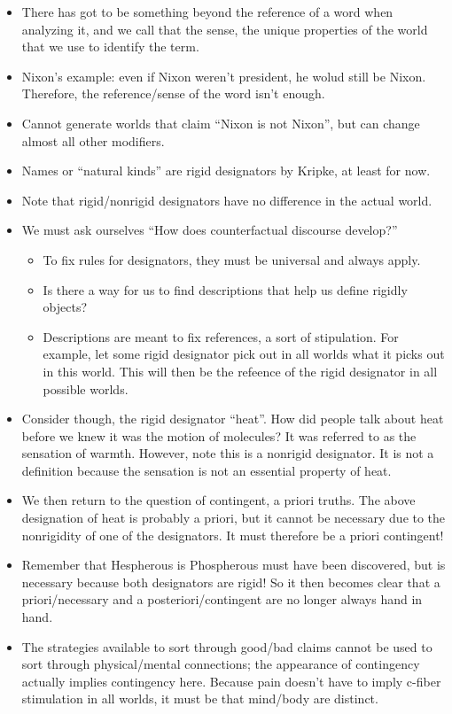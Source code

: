 \documentclass{report}
\begin{document}
\begin{itemize}
\item There has got to be something beyond the reference of a word when analyzing it, and we call that the sense, the unique properties of the world that we use to identify the term.
\item Nixon's example: even if Nixon weren't president, he wolud still be Nixon. Therefore, the reference/sense of the word isn't enough. 
\item Cannot generate worlds that claim ``Nixon is not Nixon'', but can change almost all other modifiers. 
\item Names or ``natural kinds'' are rigid designators by Kripke, at least for now.
\item Note that rigid/nonrigid designators have no difference in the actual world.
\item We must ask ourselves ``How does counterfactual discourse develop?''
\begin{itemize}
\item To fix rules for designators, they must be universal and always apply. 
\item Is there a way for us to find descriptions that help us define rigidly objects? 
\item Descriptions are meant to fix references, a sort of stipulation. For example, let some rigid designator pick out in all worlds what it picks out in this world. This will then be the refeence of the rigid designator in all possible worlds.  
\end{itemize}
\item Consider though, the rigid designator ``heat''. How did people talk about heat before we knew it was the motion of molecules? It was referred to as the sensation of warmth. However, note this is a nonrigid designator. It is not a definition because the sensation is not an essential property of heat.
\item We then return to the question of contingent, a priori truths. The above designation of heat is probably a priori, but it cannot be necessary due to the nonrigidity of one of the designators. It must therefore be a priori contingent!
\item Remember that Hespherous is Phospherous must have been discovered, but is necessary because both designators are rigid! So it then becomes clear that a priori/necessary and a posteriori/contingent are no longer always hand in hand.
\item The strategies available to sort through good/bad claims cannot be used to sort through physical/mental connections; the appearance of contingency actually implies contingency here. Because pain doesn't have to imply c-fiber stimulation in all worlds, it must be that mind/body are distinct.
\end{itemize}
\end{document}
